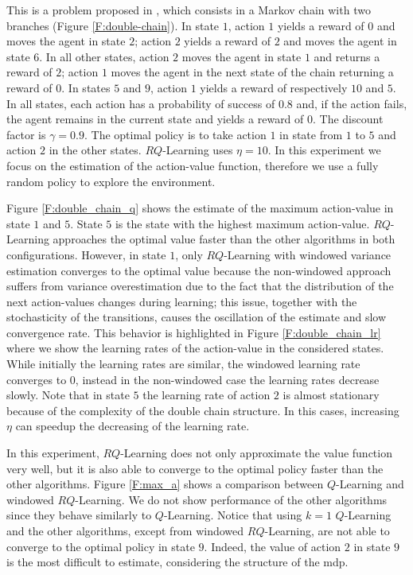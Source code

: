 This is a problem proposed in \cite{Peters2010RelativeEP}, which consists in a Markov chain with two branches (Figure \ref{F:double-chain}). In state $1$, action $1$ yields a reward of $0$ and moves the agent in state $2$; action $2$ yields a reward of $2$ and moves the agent in state $6$. In all other states, action $2$ moves the agent in state $1$ and returns a reward of $2$; action $1$ moves the agent in the next state of the chain returning a reward of $0$. In states $5$ and $9$, action $1$ yields a reward of respectively $10$ and $5$. In all states, each action has a probability of success of $0.8$ and, if the action fails, the agent remains in the current state and yields a reward of $0$. The discount factor is $\gamma = 0.9$. The optimal policy is to take action $1$ in state from $1$ to $5$ and action $2$ in the other states. $RQ$-Learning uses $\eta = 10$. In this experiment we focus on the estimation of the action-value function, therefore we use a fully random policy to explore the environment.

Figure \ref{F:double_chain_q} shows the estimate of the maximum action-value in state $1$ and $5$. State $5$ is the state with the highest maximum action-value. $RQ$-Learning approaches the optimal value faster than the other algorithms in both configurations. However, in state $1$, only $RQ$-Learning with windowed variance estimation converges to the optimal value because the non-windowed approach suffers from variance overestimation due to the fact that the distribution of the next action-values changes during learning; this issue, together with the stochasticity of the transitions, causes the oscillation of the estimate and slow convergence rate. This behavior is highlighted in Figure \ref{F:double_chain_lr} where we show the learning rates of the action-value in the considered states. While initially the learning rates are similar, the windowed learning rate converges to $0$, instead in the non-windowed case the learning rates decrease slowly. Note that in state $5$ the learning rate of action $2$ is almost stationary because of the complexity of the double chain structure. In this cases, increasing $\eta$ can speedup the decreasing of the learning rate.

In this experiment, $RQ$-Learning does not only approximate the value function very well, but it is also able to converge to the optimal policy faster than the other algorithms. Figure \ref{F:max_a} shows a comparison between $Q$-Learning and windowed $RQ$-Learning. We do not show performance of the other algorithms since they behave similarly to $Q$-Learning. Notice that using $k = 1$ $Q$-Learning and the other algorithms, except from windowed $RQ$-Learning, are not able to converge to the optimal policy in state $9$. Indeed, the value of action $2$ in state $9$ is the most difficult to estimate, considering the structure of the \gls{mdp}.

